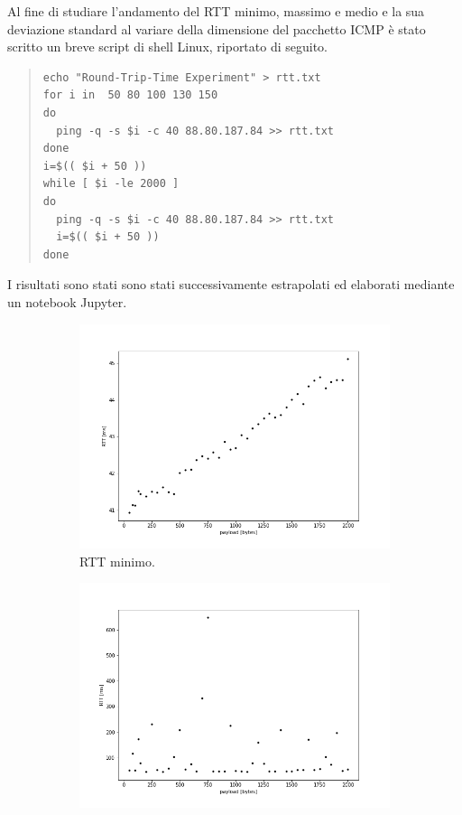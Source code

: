 \documentclass[a4paper,10pt]{article}
\begin{document}
\newpage
Al fine di studiare l'andamento del RTT minimo, massimo e medio e la sua deviazione standard al variare della dimensione del pacchetto ICMP è stato scritto un breve script di shell Linux, riportato di seguito.
\begin{quote}
\begin{verbatim}
echo "Round-Trip-Time Experiment" > rtt.txt
for i in  50 80 100 130 150
do
  ping -q -s $i -c 40 88.80.187.84 >> rtt.txt
done
i=$(( $i + 50 ))
while [ $i -le 2000 ]
do
  ping -q -s $i -c 40 88.80.187.84 >> rtt.txt
  i=$(( $i + 50 ))
done
\end{verbatim}
\end{quote}
I risultati sono stati sono stati successivamente estrapolati ed elaborati mediante un notebook Jupyter. 


\begin{figure}[h!]
     \centering
     \begin{subfigure}[b]{0.49\textwidth}
         \centering
         \includegraphics[width=\textwidth]{img/min.png}
         \caption{RTT minimo.}
         \label{fig:rttmin}
     \end{subfigure}
     \hfill
     \begin{subfigure}[b]{0.49\textwidth}
         \centering
         \includegraphics[width=\textwidth]{img/max.png}

\end{subfigure}
\end{figure}
\end{document}
